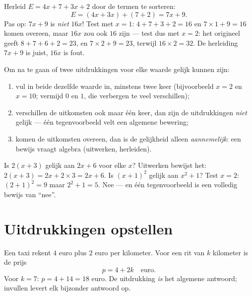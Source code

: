 \begin{example}\label{ex:g7:literal:reduce}
Herleid $E = 4x + 7 + 3x + 2$ door de termen te sorteren:
\[
E = (4x + 3x) + (7 + 2) = 7x + 9 .
\]
Pas op: $7x + 9$ is \emph{niet} $16x$! Test met $x = 1$: $4 + 7 + 3 + 2 = 16$ en
$7 \times 1 + 9 = 16$ komen overeen, maar $16x$ zou ook $16$ zijn --- test dus met
$x = 2$: het origineel geeft $8 + 7 + 6 + 2 = 23$, en $7 \times 2 + 9 = 23$,
terwijl $16 \times 2 = 32$. De herleiding $7x + 9$ is juist, $16x$ is fout.
\end{example}

\begin{method}\label{met:g7:literal:test}
Om na te gaan of twee uitdrukkingen voor elke waarde gelijk kunnen zijn:
\begin{enumerate}
  \item vul in beide dezelfde waarde in, minstens twee keer (bijvoorbeeld
        $x = 2$ en $x = 10$; vermijd $0$ en $1$, die verbergen te veel
        verschillen);
  \item verschillen de uitkomsten ook maar één keer, dan zijn de uitdrukkingen
        \emph{niet} gelijk --- één tegenvoorbeeld velt een algemene bewering;
  \item komen de uitkomsten overeen, dan is de gelijkheid alleen
        \emph{aannemelijk}: een bewijs vraagt algebra (uitwerken, herleiden).
\end{enumerate}
\end{method}

\begin{example}\label{ex:g7:literal:test}
Is $2(x + 3)$ gelijk aan $2x + 6$ voor elke $x$? Uitwerken bewijst het:
$2(x+3) = 2x + 2 \times 3 = 2x + 6$. Is $(x + 1)^2$ gelijk aan $x^2 + 1$? Test
$x = 2$: $(2+1)^2 = 9$ maar $2^2 + 1 = 5$. Nee --- en één tegenvoorbeeld is een
volledig bewijs van ``nee''.
\end{example}

\section{Uitdrukkingen opstellen}

\begin{example}\label{ex:g7:literal:produce}
Een taxi rekent $4$ euro plus $2$ euro per kilometer. Voor een rit van $k$
kilometer is de prijs
\[
p = 4 + 2k \quad\text{euro}.
\]
Voor $k = 7$: $p = 4 + 14 = 18$ euro. De uitdrukking \emph{is} het algemene
antwoord; invullen levert elk bijzonder antwoord op.
\end{example}

